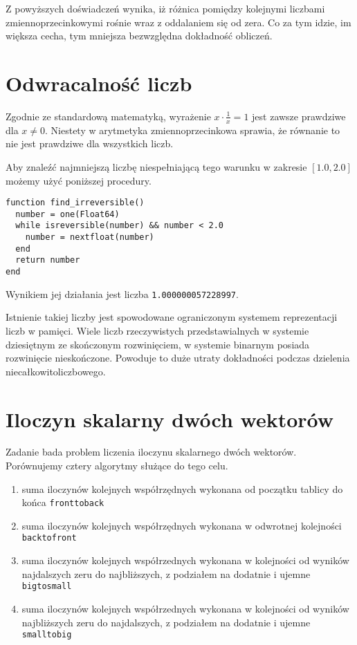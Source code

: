 \documentclass{article}
\begin{document}
Z powyższych doświadczeń wynika, iż różnica pomiędzy kolejnymi liczbami zmiennoprzecinkowymi rośnie wraz z oddalaniem się od zera.
Co za tym idzie, im większa cecha, tym mniejsza bezwzględna dokładność obliczeń.

\section{Odwracalność liczb}

Zgodnie ze standardową matematyką, wyrażenie $x \cdot \frac{1}{x} = 1$ jest zawsze prawdziwe dla $x \neq 0$.
Niestety w arytmetyka zmiennoprzecinkowa sprawia, że równanie to nie jest prawdziwe dla wszystkich liczb.

Aby znaleźć najmniejszą liczbę niespełniającą tego warunku w zakresie $[1.0, 2.0]$ możemy użyć poniższej procedury.

\begin{lstlisting}
function find_irreversible()
  number = one(Float64)
  while isreversible(number) && number < 2.0
    number = nextfloat(number)
  end
  return number
end
\end{lstlisting}

Wynikiem jej działania jest liczba \texttt{1.000000057228997}.

Istnienie takiej liczby jest spowodowane ograniczonym systemem reprezentacji liczb w pamięci.
Wiele liczb rzeczywistych przedstawialnych w systemie dziesiętnym ze skończonym rozwinięciem, w systemie binarnym posiada rozwinięcie nieskończone.
Powoduje to duże utraty dokładności podczas dzielenia niecałkowitoliczbowego.

\section{Iloczyn skalarny dwóch wektorów}

Zadanie bada problem liczenia iloczynu skalarnego dwóch wektorów.
Porównujemy cztery algorytmy służące do tego celu.

\begin{enumerate}
  \item suma iloczynów kolejnych współrzędnych wykonana od początku tablicy do końca \texttt{fronttoback}
  \item suma iloczynów kolejnych współrzędnych wykonana w odwrotnej kolejności \texttt{backtofront}
  \item suma iloczynów kolejnych współrzednych wykonana w kolejności od wyników najdalszych zeru do najbliższych, z podziałem na dodatnie i ujemne \texttt{bigtosmall}
  \item suma iloczynów kolejnych współrzednych wykonana w kolejności od wyników najbliższych zeru do najdalszych, z podziałem na dodatnie i ujemne \texttt{smalltobig}
\end{enumerate}
\end{document}
